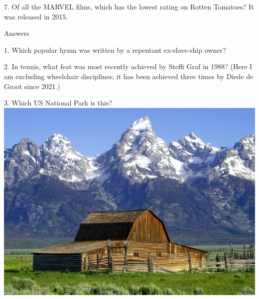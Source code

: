 \begin{frame}
\begin{center}
\Large
7. Of all the MARVEL films, which has the lowest rating on Rotten Tomatoes? It was released in 2015.
\end{center}
\end{frame}
\begin{frame}
\begin{center}
\Huge
Answers
\end{center}
\end{frame}
\begin{frame}
\begin{center}
\Large
1. Which popular hymn was written by a repentant ex-slave-ship owner?
\\
\end{center}
\end{frame}
\begin{frame}
\begin{center}
\Large
2. In tennis, what feat was most recently achieved by Steffi Graf in 1988? (Here I am excluding wheelchair disciplines; it has been achieved three times by Diede de Groot since 2021.)
\\
\end{center}
\end{frame}
\begin{frame}
\begin{center}
\Large
3. Which US National Park is this?
\\
\vspace{0.5em}\includegraphics[height=0.6\paperheight]{images/grand_tetons.jpg}
\\
\end{center}
\end{frame}
